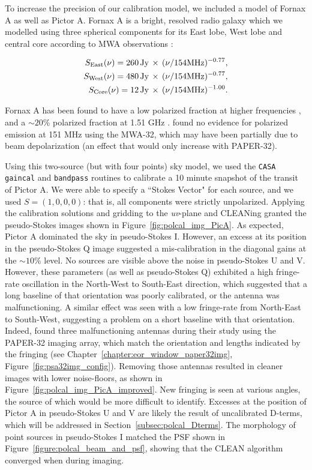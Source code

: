 To increase the precision of our calibration model, we included a model of Fornax A as well as Pictor A. Fornax A is a bright, resolved radio galaxy which we modelled using three spherical components for its East lobe, West lobe and central core according to MWA observations \citep{McKinley.15}:

\begin{eqnarray}
S_{\rm East}(\nu)= 260\,{\rm Jy}\,\times\,(\nu/154{\rm MHz})^{- 0.77},\\
S_{\rm West}(\nu)= 480\,{\rm Jy}\,\times\,(\nu/154{\rm MHz})^{- 0.77},\\
S_{\rm Core}(\nu)= 12\,{\rm Jy}\,\times\,(\nu/154{\rm MHz})^{- 1.00}.\\
\end{eqnarray}

Fornax A has been found to have a low polarized fraction at higher frequencies \citep[20 GHz][]{Lopez-Caniego.09}, and a $\sim20$\% polarized fraction at 1.51 GHz \citep{Fomalont.89}. \cite{Bernardi.13} found no evidence for polarized emission at 151 MHz using the MWA-32, which may have been partially due to beam depolarization (an effect that would only increase with PAPER-32).

Using this two-source (but with four points) sky model, we used the {\tt CASA} {\tt gaincal} and {\tt bandpass} routines to calibrate a 10 minute snapshot of the transit of Pictor A. We were able to specify a ``Stokes Vector" for each source, and we used $S=(1,0,0,0)$: that is, all components were strictly unpolarized. Applying the calibration solutions and gridding to the \textit{uv}-plane and CLEANing granted the pseudo-Stokes images shown in Figure~\ref{fig:polcal_img_PicA}. As expected, Pictor A dominated the sky in pseudo-Stokes I. However, an excess at its position in the pseudo-Stokes Q image suggested a mis-calibration in the diagonal gains at the $\sim10$\% level. No sources are visible above the noise in pseudo-Stokes U and V. However, these parameters (as well as pseudo-Stokes Q) exhibited a high fringe-rate oscillation in the North-West to South-East direction, which suggested that a long baseline of that orientation was poorly calibrated, or the antenna was malfunctioning. A similar effect was seen with a low fringe-rate from North-East to South-West, suggesting a problem on a short baseline with that orientation. Indeed, \cite{Kohn.16} found three malfunctioning antennas during their study using the PAPER-32 imaging array, which match the orientation and lengths indicated by the fringing (see Chapter~\ref{chapter:eor_window_paper32img}, Figure~\ref{fig:psa32img_config}). Removing those antennas resulted in cleaner images with lower noise-floors, as shown in Figure~\ref{fig:polcal_img_PicA_improved}. New fringing is seen at various angles, the source of which would be more difficult to identify. Excesses at the position of Pictor A in pseudo-Stokes U and V are likely the result of uncalibrated D-terms, which will be addressed in Section~\ref{subsec:polcal_Dterms}.
The morphology of point sources in pseudo-Stokes I matched the PSF shown in Figure~\ref{figure:polcal_beam_and_psf}, showing that the CLEAN algorithm converged when during imaging.

